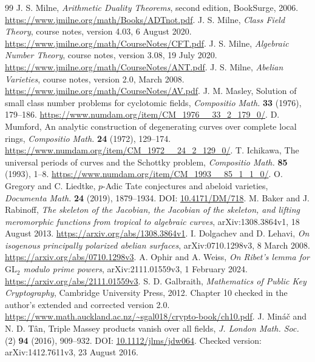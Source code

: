 \begin{thebibliography}{99}
 J. S. Milne, \emph{Arithmetic Duality Theorems}, second edition, BookSurge, 2006. \url{https://www.jmilne.org/math/Books/ADTnot.pdf}.
 J. S. Milne, \emph{Class Field Theory}, course notes, version 4.03, 6 August 2020. \url{https://www.jmilne.org/math/CourseNotes/CFT.pdf}.
 J. S. Milne, \emph{Algebraic Number Theory}, course notes, version 3.08, 19 July 2020. \url{https://www.jmilne.org/math/CourseNotes/ANT.pdf}.
 J. S. Milne, \emph{Abelian Varieties}, course notes, version 2.0, March 2008. \url{https://www.jmilne.org/math/CourseNotes/AV.pdf}.
 J. M. Masley, Solution of small class number problems for cyclotomic fields, \emph{Compositio Math.} \textbf{33} (1976), 179--186. \url{https://www.numdam.org/item/CM_1976__33_2_179_0/}.
 D. Mumford, An analytic construction of degenerating curves over complete local rings, \emph{Compositio Math.} \textbf{24} (1972), 129--174. \url{https://www.numdam.org/item/CM_1972__24_2_129_0/}.
 T. Ichikawa, The universal periods of curves and the Schottky problem, \emph{Compositio Math.} \textbf{85} (1993), 1--8. \url{https://www.numdam.org/item/CM_1993__85_1_1_0/}.
 O. Gregory and C. Liedtke, $p$-Adic Tate conjectures and abeloid varieties, \emph{Documenta Math.} \textbf{24} (2019), 1879--1934. DOI: \href{https://doi.org/10.4171/DM/718}{10.4171/DM/718}.
 M. Baker and J. Rabinoff, \emph{The skeleton of the Jacobian, the Jacobian of the skeleton, and lifting meromorphic functions from tropical to algebraic curves}, arXiv:1308.3864v1, 18 August 2013. \url{https://arxiv.org/abs/1308.3864v1}.
 I. Dolgachev and D. Lehavi, \emph{On isogenous principally polarized abelian surfaces}, arXiv:0710.1298v3, 8 March 2008. \url{https://arxiv.org/abs/0710.1298v3}.
 A. Ophir and A. Weiss, \emph{On Ribet's lemma for $\mathrm{GL}_2$ modulo prime powers}, arXiv:2111.01559v3, 1 February 2024. \url{https://arxiv.org/abs/2111.01559v3}.
 S. D. Galbraith, \emph{Mathematics of Public Key Cryptography}, Cambridge University Press, 2012. Chapter 10 checked in the author's extended and corrected version 2.0. \url{https://www.math.auckland.ac.nz/~sgal018/crypto-book/ch10.pdf}.
 J. Min\'{a}\v{c} and N. D. T\^{a}n, Triple Massey products vanish over all fields, \emph{J. London Math. Soc.} (2) \textbf{94} (2016), 909--932. DOI: \href{https://doi.org/10.1112/jlms/jdw064}{10.1112/jlms/jdw064}. Checked version: arXiv:1412.7611v3, 23 August 2016.

\end{thebibliography}
